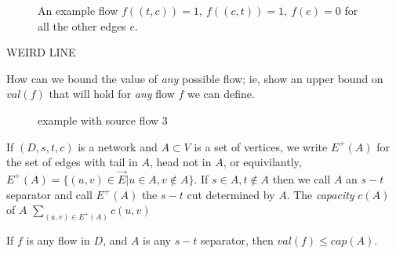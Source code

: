 \documentclass{article}
\begin{document}
\begin{figure}[H]


\caption{An example flow $f((t,c))=1, ~f((c,t))=1,~f(e)=0$ for all the other edges $e$.}
\end{figure}

WEIRD LINE

How can we bound the value of \emph{any} possible flow; ie, show an upper bound on $val(f)$ that will hold for \emph{any} flow $f$ we can define.

\begin{figure}[H]
 
\caption{example with source flow 3}
\end{figure}


\begin{defn}
If $(D,s,t,c)$ is a network and $A \subset V$ is a set of vertices, we write $E^+(A)$ for the set of edges with tail in $A$, head not in $A$, or equivilantly, $E^+(A)=\{(u,v) \in \overrightarrow{E} | u \in A, v \notin  A\}$.  If $s \in A, t \notin A$ then we call $A$ an $s-t$ separator and call $E^+(A)$ the $s-t$ cut determined by $A$.  The \emph{capacity} $c(A)$ of $A$ $\displaystyle\sum_{(u,v)\in E^+(A)} c(u,v)$
\end{defn}

\begin{lem}
\label{val-cap}
If $f$ is any flow in $D$, and $A$ is any $s-t$ separator, then $val(f) \leq cap(A)$.
\end{lem}
\end{document}
